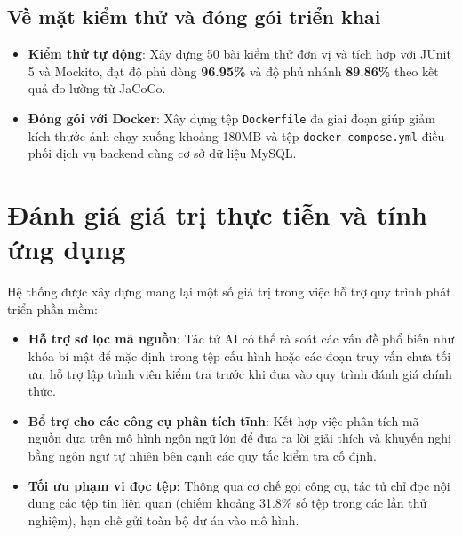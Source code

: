 \documentclass[12pt,a4paper]{report}
\begin{document}
\subsection{Về mặt kiểm thử và đóng gói triển khai}
\begin{itemize}
    \item \textbf{Kiểm thử tự động}: Xây dựng 50 bài kiểm thử đơn vị và tích hợp với JUnit 5 và Mockito, đạt độ phủ dòng \textbf{96.95\%} và độ phủ nhánh \textbf{89.86\%} theo kết quả đo lường từ JaCoCo.
    \item \textbf{Đóng gói với Docker}: Xây dựng tệp \texttt{Dockerfile} đa giai đoạn giúp giảm kích thước ảnh chạy xuống khoảng 180MB và tệp \texttt{docker-compose.yml} điều phối dịch vụ backend cùng cơ sở dữ liệu MySQL.
\end{itemize}

\section{Đánh giá giá trị thực tiễn và tính ứng dụng}
Hệ thống được xây dựng mang lại một số giá trị trong việc hỗ trợ quy trình phát triển phần mềm:
\begin{itemize}
    \item \textbf{Hỗ trợ sơ lọc mã nguồn}: Tác tử AI có thể rà soát các vấn đề phổ biến như khóa bí mật để mặc định trong tệp cấu hình hoặc các đoạn truy vấn chưa tối ưu, hỗ trợ lập trình viên kiểm tra trước khi đưa vào quy trình đánh giá chính thức.
    \item \textbf{Bổ trợ cho các công cụ phân tích tĩnh}: Kết hợp việc phân tích mã nguồn dựa trên mô hình ngôn ngữ lớn để đưa ra lời giải thích và khuyến nghị bằng ngôn ngữ tự nhiên bên cạnh các quy tắc kiểm tra cố định.
    \item \textbf{Tối ưu phạm vi đọc tệp}: Thông qua cơ chế gọi công cụ, tác tử chỉ đọc nội dung các tệp tin liên quan (chiếm khoảng 31.8\% số tệp trong các lần thử nghiệm), hạn chế gửi toàn bộ dự án vào mô hình.
\end{itemize}
\end{document}
